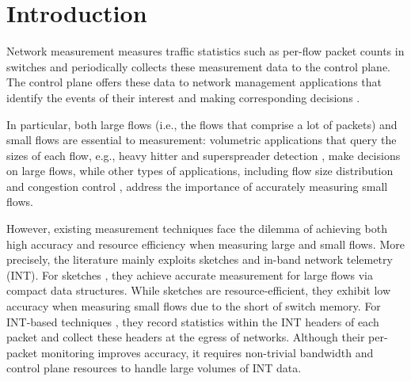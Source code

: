 \section{Introduction}

Network measurement measures traffic statistics such as per-flow packet counts in switches and periodically collects these measurement data to the control plane. The control plane offers these data to network management applications that identify the events of their interest and making corresponding decisions \cite{huang2025adaptive}. 

In particular, both large flows (i.e., the flows that comprise a lot of packets) and small flows are essential to measurement: volumetric applications that query the sizes of each flow, e.g., heavy hitter and superspreader detection \cite{huang2021spread,huang2017sketchvisor}, make decisions on large flows, while other types of applications, including flow size distribution \cite{chen2021mtp} and congestion control \cite{ben2020pint,sheng2021deltaint}, address the importance of accurately measuring small flows. 



However, existing measurement techniques face the dilemma of achieving both high accuracy and resource efficiency when measuring large and small flows. 
More precisely, the literature mainly exploits sketches and in-band network telemetry (INT). For sketches \cite{li2016flowradar,yang2018elastic,huang2017sketchvisor,huang2018sketchlearn,liu2016one,huang2021toward,liu2019nitrosketch,zhang2021cocosketch,namkung2022sketchlib}, they achieve accurate measurement for large flows via compact data structures. While sketches are resource-efficient, they exhibit low accuracy when measuring small flows due to the short of switch memory. For INT-based techniques \cite{sheng2021deltaint,ben2020pint,handigol2014know,pan2019int,zhu2015packet}, they record statistics within the INT headers of each packet and collect these headers at the egress of networks. Although their per-packet monitoring improves accuracy, it requires non-trivial bandwidth and control plane resources to handle large volumes of INT data. 

